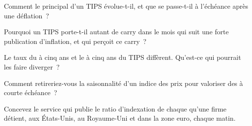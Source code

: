 \begin{interviewq}\label{iq:m2:inflation-markets:2}
Comment le principal d'un TIPS évolue-t-il, et que se passe-t-il à
l'échéance après une déflation~?
\end{interviewq}

\begin{interviewq}\label{iq:m2:inflation-markets:3}
Pourquoi un TIPS porte-t-il autant de carry dans le mois qui suit une forte publication d'inflation, et
qui perçoit ce carry~?
\end{interviewq}

\begin{interviewq}\label{iq:m2:inflation-markets:4}
Le taux du  à cinq ans et le  à cinq ans du TIPS diffèrent. Qu'est-ce qui pourrait les faire diverger~?
\end{interviewq}

\begin{interviewq}\label{iq:m2:inflation-markets:5}
Comment retireriez-vous la saisonnalité d'un indice des prix pour valoriser des
 à courte échéance~?
\end{interviewq}

\begin{interviewq}\label{iq:m2:inflation-markets:6}
Concevez le service qui publie le ratio d'indexation de chaque  qu'une firme détient,
aux États-Unis, au Royaume-Uni et dans la zone euro, chaque matin.
\end{interviewq}
